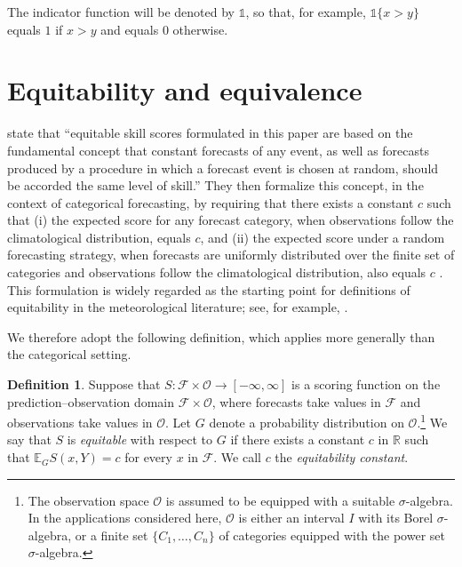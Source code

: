 \documentclass[10pt]{article} %
\theoremstyle{theorem}
\theoremstyle{definition}
\newtheorem{defn}{Definition}
\newcommand{\RRR}{\mathbb{R}}
\newcommand{\EEE}{\mathbb{E}}
\newcommand{\one}{\mathds{1}}
\begin{document}
The indicator function will be denoted by $\one$, so that, for example, $\one\{x>y\}$ equals $1$ if $x>y$ and equals $0$ otherwise.

\section{Equitability and equivalence}\label{s:equitability}

\citet{gandin1992equitable} state that ``equitable skill scores formulated in this paper are based on the fundamental concept that constant forecasts of any event, as well as forecasts produced by a procedure in which a forecast event is chosen at random, should be accorded the same level of skill.'' They then formalize this concept, in the context of categorical forecasting, by requiring that there exists a constant $c$ such that (i) the expected score for any forecast category, when observations follow the climatological distribution, equals $c$, and (ii) the expected score under a random forecasting strategy, when forecasts are uniformly distributed over the finite set of categories and observations follow the climatological distribution, also equals $c$ \citep[Eqs.~(2,3)]{gandin1992equitable}. This formulation is widely regarded as the starting point for definitions of equitability in the meteorological literature; see, for example, \citet{hogan2010equitability}.

We therefore adopt the following definition, which applies more generally than the categorical setting.

\begin{defn}\label{def:equitability}
Suppose that $S:\mathcal{F}\times\mathcal{O}\to [-\infty,\infty]$ is a scoring function on the prediction--observation domain $\mathcal{F}\times\mathcal{O}$, where forecasts take values in $\mathcal{F}$ and observations take values in $\mathcal{O}$. Let $G$ denote a probability distribution on $\mathcal{O}$.\footnote{The observation space $\mathcal{O}$ is assumed to be equipped with a suitable $\sigma$-algebra. In the applications considered here, $\mathcal{O}$ is either an interval $I$ with its Borel $\sigma$-algebra, or a finite set $\{C_1,\ldots,C_n\}$ of categories equipped with the power set $\sigma$-algebra.} We say that $S$ is \textit{equitable} with respect to $G$ if there exists a constant $c$ in $\RRR$ such that $\EEE_G S(x,Y) = c$ for every $x$ in $\mathcal{F}$. We call $c$ the \textit{equitability constant}.
\end{defn}
\end{document}
